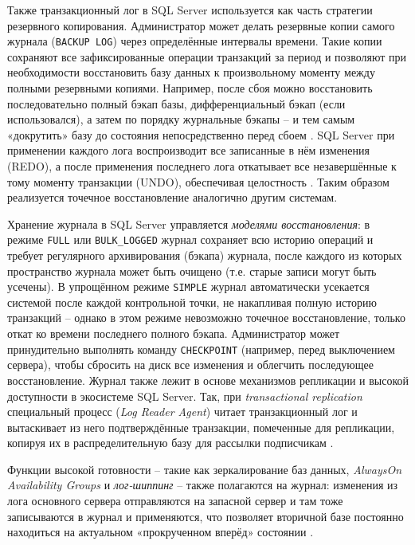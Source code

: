  Также транзакционный лог в SQL Server используется как часть стратегии резервного копирования. Администратор может делать резервные копии самого журнала (\texttt{BACKUP LOG}) через определённые интервалы времени. Такие копии сохраняют все зафиксированные операции транзакций за период и позволяют при необходимости восстановить базу данных к произвольному моменту между полными резервными копиями. Например, после сбоя можно восстановить последовательно полный бэкап базы, дифференциальный бэкап (если использовался), а затем по порядку журнальные бэкапы – и тем самым «докрутить» базу до состояния непосредственно перед сбоем \autocite{MicrosoftLearnSQLserverTransLog}. SQL Server при применении каждого лога воспроизводит все записанные в нём изменения (REDO), а после применения последнего лога откатывает все незавершённые к тому моменту транзакции (UNDO), обеспечивая целостность \autocite{MicrosoftLearnSQLserverTransLog}. Таким образом реализуется точечное восстановление аналогично другим системам. 
 
 Хранение журнала в SQL Server управляется \textit{моделями восстановления}: в режиме \texttt{FULL} или \texttt{BULK\_LOGGED} журнал сохраняет всю историю операций и требует регулярного архивирования (бэкапа) журнала, после каждого из которых пространство журнала может быть очищено (т.е. старые записи могут быть усечены). В упрощённом режиме \texttt{SIMPLE} журнал автоматически усекается системой после каждой контрольной точки, не накапливая полную историю транзакций – однако в этом режиме невозможно точечное восстановление, только откат ко времени последнего полного бэкапа. Администратор может принудительно выполнять команду \texttt{CHECKPOINT} (например, перед выключением сервера), чтобы сбросить на диск все изменения и облегчить последующее восстановление. Журнал также лежит в основе механизмов репликации и высокой доступности в экосистеме SQL Server. Так, при \textit{transactional replication} специальный процесс (\textit{Log Reader Agent}) читает транзакционный лог и вытаскивает из него подтверждённые транзакции, помеченные для репликации, копируя их в распределительную базу для рассылки подписчикам \autocite{MicrosoftLearnSQLserverTransLog}. 
 
 Функции высокой готовности – такие как зеркалирование баз данных, \textit{AlwaysOn Availability Groups} и \textit{лог-шиппинг} – также полагаются на журнал: изменения из лога основного сервера отправляются на запасной сервер и там тоже записываются в журнал и применяются, что позволяет вторичной базе постоянно находиться на актуальном «прокрученном вперёд» состоянии \autocite{MicrosoftLearnSQLserverTransLog}.

